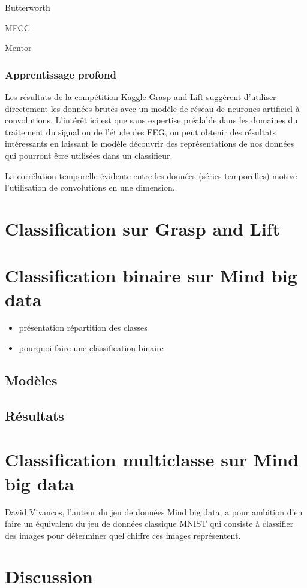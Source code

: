 \documentclass{article} %
\begin{document}
\par{Butterworth}

\par{MFCC}

\par{Mentor}

\subsubsection{Apprentissage profond}

Les résultats de la compétition Kaggle Grasp and Lift suggèrent d'utiliser directement les données brutes avec un modèle de réseau de neurones artificiel à convolutions. L'intérêt ici est que sans expertise préalable dans les domaines du traitement du signal ou de l'étude des EEG, on peut obtenir des résultats intéressants en laissant le modèle découvrir des représentations de nos données qui pourront être utilisées dans un classifieur.

La corrélation temporelle évidente entre les données (séries temporelles) motive l'utilisation de convolutions en une dimension.

\section{Classification sur Grasp and Lift}

\section{Classification binaire sur Mind big data}

\begin{itemize}
\item présentation répartition des classes
\item pourquoi faire une classification binaire
\end{itemize}

\subsection{Modèles}

\subsection{Résultats}

\section{Classification multiclasse sur Mind big data}

David Vivancos, l'auteur du jeu de données Mind big data, a pour ambition d'en faire un équivalent du jeu de données classique MNIST qui consiste à classifier des images pour déterminer quel chiffre ces images représentent.

\section{Discussion}
\end{document}
